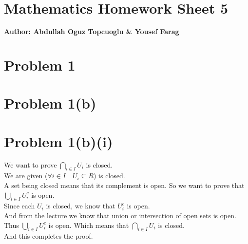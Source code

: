 \documentclass{article}
\begin{document}
\section*{\huge Mathematics Homework Sheet 5}
\begin{flushright}
   \textbf{Author: Abdullah Oguz Topcuoglu \& Yousef Farag}
\end{flushright}

\section*{Problem 1}

\section*{Problem 1(b)}
\section*{Problem 1(b)(i)}
We want to prove \(\bigcap_{i \in I} U_i\) is closed.\\
We are given (\(\forall i \in I \quad U_i \subseteq R\)) is closed. \\
A set being closed means that its complement is open. So we want to prove that \(\bigcup_{i \in I} U_i^c\) is open.\\
Since each \(U_i\) is closed, we know that \(U_i^c\) is open.\\
And from the lecture we know that union or intersection of open sets is open. Thus \(\bigcup_{i \in I} U_i^c\) is open. Which means that \(\bigcap_{i \in I} U_i\) is closed.\\
And this completes the proof.\\
\end{document}
